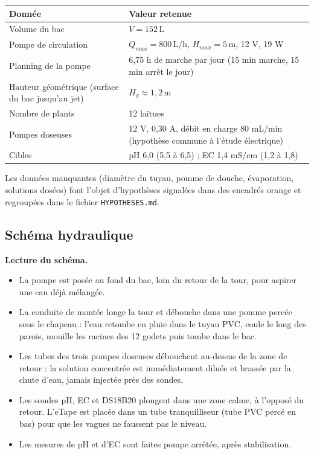 \documentclass[11pt,a4paper]{article}
\newcommand{\U}[1]{\,\mathrm{#1}}
\begin{document}
\begin{center}
\begin{tabular}{>{\raggedright}p{6.2cm}p{7.4cm}}
\toprule
\textbf{Donnée} & \textbf{Valeur retenue} \\
\midrule
Volume du bac & $V = 152\U{L}$ \\
Pompe de circulation & $Q_{max} = 800\U{L/h}$, $H_{max} = 5\U{m}$, 12 V, 19 W \\
Planning de la pompe & 6,75 h de marche par jour (15 min marche, 15 min arrêt le jour) \\
Hauteur géométrique (surface du bac jusqu'au jet) & $H_g \approx 1{,}2\U{m}$ \\
Nombre de plants & 12 laitues \\
Pompes doseuses & 12 V, 0,30 A, débit en charge 80 mL/min (hypothèse commune à l'étude électrique) \\
Cibles & pH 6,0 (5,5 à 6,5) ; EC 1,4 mS/cm (1,2 à 1,8) \\
\bottomrule
\end{tabular}
\end{center}

Les données manquantes (diamètre du tuyau, pomme de douche, évaporation, solutions dosées) font l'objet d'hypothèses signalées dans des encadrés orange et regroupées dans le fichier \texttt{HYPOTHESES.md}.

\begin{landscape}
\section{Schéma hydraulique}
\begin{center}

\end{center}
\end{landscape}

\textbf{Lecture du schéma.}
\begin{itemize}
  \item La pompe est posée au fond du bac, loin du retour de la tour, pour aspirer une eau déjà mélangée.
  \item La conduite de montée longe la tour et débouche dans une pomme percée sous le chapeau : l'eau retombe en pluie dans le tuyau PVC, coule le long des parois, mouille les racines des 12 godets puis tombe dans le bac.
  \item Les tubes des trois pompes doseuses débouchent au-dessus de la zone de retour : la solution concentrée est immédiatement diluée et brassée par la chute d'eau, jamais injectée près des sondes.
  \item Les sondes pH, EC et DS18B20 plongent dans une zone calme, à l'opposé du retour. L'eTape est placée dans un tube tranquilliseur (tube PVC percé en bas) pour que les vagues ne faussent pas le niveau.
  \item Les mesures de pH et d'EC sont faites pompe arrêtée, après stabilisation.
\end{itemize}
\end{document}
